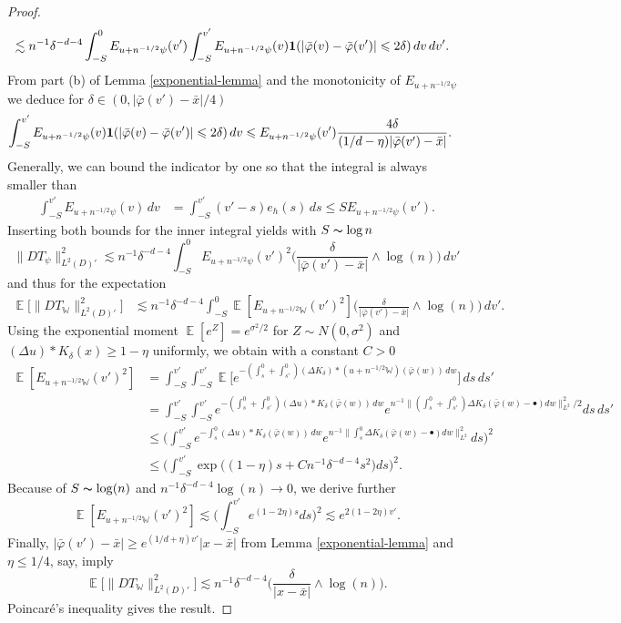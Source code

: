 \documentclass{article}
\numberwithin{equation}{section}
\theoremstyle{definition}
\DeclareMathOperator{\E}{{\mathbb E}}
\renewcommand{\phi}{\varphi}
\renewcommand{\cdot}{{\scriptstyle \bullet} }
\providecommand{\abs}[1]{\lvert #1 \rvert}
\providecommand{\norm}[1]{\lVert #1 \rVert}
\renewcommand{\le}{\leqslant}
\renewcommand{\ge}{\geqslant}
\begin{document}
\begin{proof}
\begin{align*}
& \lesssim n^{-1}\delta^{-d-4}\int_{-S}^0 E_{u+n^{-1/2}\psi}(v')\int_{-S}^{v'}  E_{u+n^{-1/2}\psi}(v){\bf 1}(\abs{\bar \phi(v)-\bar \phi(v')}\le2\delta)\, dv\,dv'.
\end{align*}
From part (b) of Lemma \ref{exponential-lemma} and  the monotonicity of $E_{u+n^{-1/2}\psi}$ we deduce for 
$\delta\in(0, |\bar\varphi(v')-\bar x|/4)$
\begin{align*} 
\int_{-S}^{v'} E_{u+n^{-1/2}\psi}(v){\bf 1}(\abs{\bar \phi(v)-\bar \phi(v')}\le2\delta)\,dv &\le E_{u+n^{-1/2}\psi}(v')\frac{4 \delta}{(1/d-\eta)\abs{\bar\phi(v')-\bar x}}.
\end{align*}
Generally, we can bound the indicator by one so that the integral is always smaller than
\begin{align*} 
\int_{-S}^{v'} E_{u+n^{-1/2}\psi}(v)\,dv &= 
\int_{-S}^{v'} (v'-s)  e_h(s)\,ds\le S E_{u+n^{-1/2}\psi}(v').
\end{align*}
Inserting both bounds for the inner integral yields with $S\thicksim \log n$
\[ \norm{DT_\psi}_{L^2(D)'}^2\lesssim n^{-1}\delta^{-d-4}\int_{-S}^0 E_{u+n^{-1/2}\psi}(v')^2\Big(\frac{ \delta }{\abs{\bar\phi(v')-\bar x}}\wedge \log(n)\Big)\,dv'
\]
and thus for the expectation
\begin{align*}
\E\big[\norm{DT_{\mathbb W}}_{L^2(D)'}^2\big] 
& \lesssim n^{-1}\delta^{-d-4}\int_{-S}^0 \E[E_{u+n^{-1/2}{\mathbb W}}(v')^2]\Big(\frac{ \delta }{\abs{\bar\phi(v')-\bar x}}\wedge \log(n)\Big)\,dv'.
\end{align*}
Using the exponential moment $\E[e^Z]=e^{\sigma^2/2}$ for $Z\sim N(0,\sigma^2)$ and $(\Delta u)\ast K_\delta(x)\ge 1-\eta$ uniformly, we obtain with a constant $C>0$
\begin{align*}
\E[E_{u+n^{-1/2}{\mathbb W}}(v')^2]&=\int_{-S}^{v'} \int_{-S}^{v'} \E\Big[e^{-(\int_s^0+\int_{s'}^0) (\Delta K_\delta)\ast (u+n^{-1/2}\mathbb W)(\bar\phi(w))\,dw}\Big]\,ds\,ds'\\
&=\int_{-S}^{v'}\int_{-S}^{v'} e^{-(\int_s^0+\int_{s'}^0) (\Delta u)\ast K_\delta(\bar\phi(w))\,dw}e^{n^{-1}\norm{(\int_s^0+\int_{s'}^0)\Delta K_\delta(\bar\phi(w)-\cdot)dw}_{L^2}^2/2} ds\,ds'\\
&\le\Big(\int_{-S}^{v'} e^{-\int_s^0 (\Delta u)\ast K_\delta(\bar\phi(w))\,dw}e^{n^{-1}\norm{\int_s^0\Delta K_\delta(\bar\phi(w)-\cdot)dw}_{L^2}^2} ds\Big)^2\\
&\le\Big(\int_{-S}^{v'} \exp\Big((1-\eta)s+Cn^{-1}\delta^{-d-4}s^2\Big) ds\Big)^2.
\end{align*}
Because of $S\thicksim\log(n)$ and $n^{-1}\delta^{-d-4}\log(n)\to 0$, we derive further 
\[ \E[E_{u+n^{-1/2}{\mathbb W}}(v')^2]\lesssim \Big(\int_{-S}^{v'} e^{(1-2\eta)s} ds\Big)^2\lesssim e^{2(1-2\eta)v'}.\]
Finally, $\abs{\bar\phi(v')-\bar x}\ge e^{(1/d+\eta)v'}\abs{x-\bar x}$ from Lemma \ref{exponential-lemma} and $\eta\le 1/4$, say, imply
\[ \E\big[\norm{DT_{\mathbb W}}_{L^2(D)'}^2\big] \lesssim n^{-1}\delta^{-d-4}\Big(\frac{\delta}{\abs{x-\bar x}}\wedge \log(n)\Big).
\]
Poincar\'e's inequality gives the result.
\end{proof}
\end{document}
